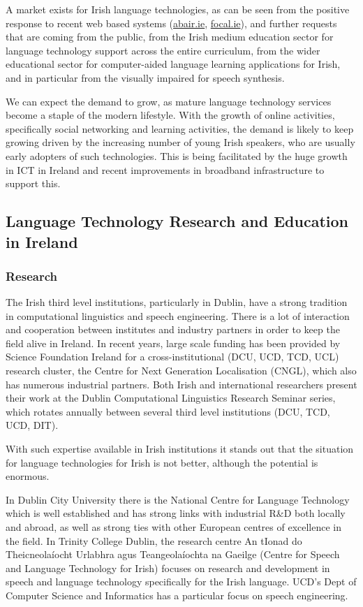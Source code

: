 \begin{multicols}{2}
A market exists for Irish language technologies, as can be seen from the positive response to recent web based systems (\url{abair.ie}, \url{focal.ie}), and further requests that are coming from the public, from the Irish medium education sector for language technology support across the entire curriculum,  from the wider educational sector for computer-aided language learning applications for Irish, and in particular from the visually impaired for speech synthesis. 

We can expect the demand to grow, as mature language technology services become a staple of the modern lifestyle. With the growth of online activities, specifically social networking and learning activities, the demand is likely to keep growing  driven by the increasing number  of young Irish speakers, who are usually early adopters of such technologies. This is being facilitated by the huge growth in ICT in Ireland and recent improvements in broadband infrastructure to support this.

\subsection{Language Technology Research and Education in Ireland}

\subsubsection{Research}

The Irish third level institutions, particularly in Dublin, have a strong tradition in computational linguistics and speech engineering. There is a lot of interaction and cooperation between institutes and industry partners in order to keep the field alive in Ireland. In recent years, large scale funding has been provided by Science Foundation Ireland for a cross-institutional (DCU, UCD, TCD, UCL) research cluster, the Centre for Next Generation Localisation (CNGL), which also has numerous industrial partners. Both Irish and international researchers present their work at the Dublin Computational Linguistics Research Seminar series, which  rotates annually between several third level institutions (DCU, TCD, UCD, DIT). 

With such expertise available in Irish institutions it stands out that the situation for language technologies for Irish is not better, although the potential is enormous. 

In Dublin City University there is the National Centre for Language Technology which is well established and has strong links with industrial R\&D both locally and abroad, as well as strong ties with other European centres of excellence in the field. In Trinity College Dublin, the research centre An tIonad do Theicneolaíocht Urlabhra agus Teangeolaíochta na Gaeilge (Centre for Speech and Language Technology for Irish) focuses on research and development in speech and language technology specifically for the Irish language. UCD’s Dept of Computer Science and Informatics has a particular focus on speech engineering.


\end{multicols}
